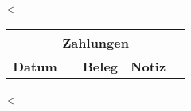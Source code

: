  \vspace{0.5cm}
 
 <%
\begin{tabular}{@{}llllr@{}}
  \multicolumn{5}{c}{\textbf{Zahlungen}} \\
  \hline
  \textbf{Datum} & & \textbf{Beleg} & \textbf{Notiz} & \textbf{Betrag <%
  \hline
<%
<%
  <%
<%
<%
\hline
\end{tabular}
<%